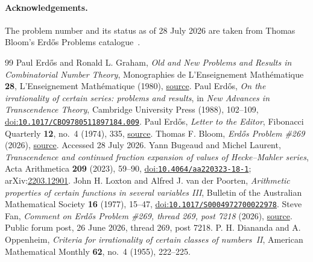 \documentclass[11pt]{article}
\begin{document}
\paragraph{Acknowledgements.}
The problem number and its status as of 28 July 2026 are taken from Thomas
Bloom's Erd\H{o}s Problems catalogue~\cite{erdosproblems}.

\begin{thebibliography}{99}
\setlength{\itemsep}{3pt plus .5pt minus .5pt}
\setlength{\parsep}{0pt}\setlength{\parskip}{0pt}
 Paul Erd\H{o}s and Ronald L. Graham,
  \emph{Old and New Problems and Results in Combinatorial Number Theory}, Monographies de L'Enseignement Math\'{e}matique \textbf{28}, L'Enseignement Math\'{e}matique (1980),
  \href{https://mathweb.ucsd.edu/~ronspubs/80_11_number_theory.pdf}{source}.
 Paul Erd\H{o}s,
  \emph{On the irrationality of certain series: problems and results}, in \emph{New Advances in Transcendence Theory}, Cambridge University Press (1988), 102--109,
  \href{https://doi.org/10.1017/CBO9780511897184.009}{doi:\nolinkurl{10.1017/CBO9780511897184.009}}.
 Paul Erd\H{o}s,
  \emph{Letter to the Editor}, Fibonacci Quarterly \textbf{12}, no.~4 (1974), 335,
  \href{https://www.fq.math.ca/Scanned/12-4/letter.pdf}{source}.
 Thomas F. Bloom,
  \emph{Erd\H{o}s Problem \#269} (2026),
  \href{https://www.erdosproblems.com/269}{source}. Accessed 28 July 2026.
 Yann Bugeaud and Michel Laurent,
  \emph{Transcendence and continued fraction expansion of values of Hecke--Mahler series}, Acta Arithmetica \textbf{209} (2023), 59--90,
  \href{https://doi.org/10.4064/aa220323-18-1}{doi:\nolinkurl{10.4064/aa220323-18-1}}; arXiv:\href{https://arxiv.org/abs/2203.12901}{2203.12901}.
 John H. Loxton and Alfred J. van der Poorten,
  \emph{Arithmetic properties of certain functions in several variables III}, Bulletin of the Australian Mathematical Society \textbf{16} (1977), 15--47,
  \href{https://doi.org/10.1017/S0004972700022978}{doi:\nolinkurl{10.1017/S0004972700022978}}.
 Steve Fan,
  \emph{Comment on Erd\H{o}s Problem \#269, thread 269, post 7218} (2026),
  \href{https://www.erdosproblems.com/forum/thread/269#post-7218}{source}. Public forum post, 26 June 2026, thread 269, post 7218.
 P. H. Diananda and A. Oppenheim,
  \emph{Criteria for irrationality of certain classes of numbers~II},
  American Mathematical Monthly \textbf{62}, no.~4 (1955), 222--225.

\end{thebibliography}
\end{document}
